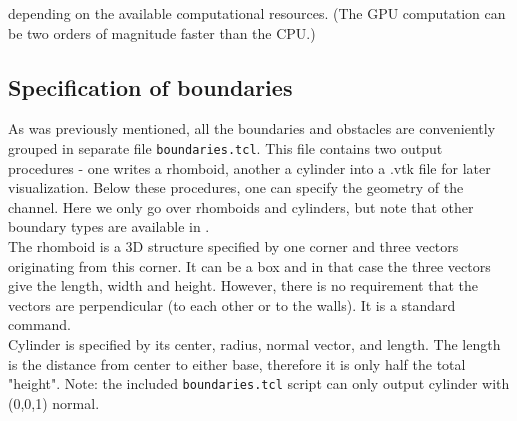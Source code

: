 \documentclass[
a4paper,                        %
11pt,                           %
twoside,                        %
footsepline,                    %
headsepline,                    %
headexclude,                    %
footexclude,                    %
pagesize,                       %
]{scrartcl}
\begin{document}
depending on the available computational resources. (The GPU computation can be two orders of magnitude faster than the CPU.)\\  

\subsection*{Specification of boundaries}
As was previously mentioned, all the boundaries and obstacles are conveniently grouped in separate file \verb|boundaries.tcl|. This file contains two output procedures - one writes a rhomboid, another a cylinder into a .vtk file for later visualization. Below these procedures, one can specify the geometry of the channel. Here we only go over rhomboids and cylinders, but note that other boundary types are available in \es.\\

The rhomboid is a 3D structure specified by one corner and three vectors originating from this corner. It can be a box and in that case the three vectors give the length, width and height. However, there is no requirement that the vectors are perpendicular (to each other or to the walls). It is a standard \es command.\\

Cylinder is specified by its center, radius, normal vector, and length. The length is the distance from center to either base, therefore it is only half the total "height". Note: the included \verb|boundaries.tcl| script can only output cylinder with (0,0,1) normal. \\ 
\end{document}
